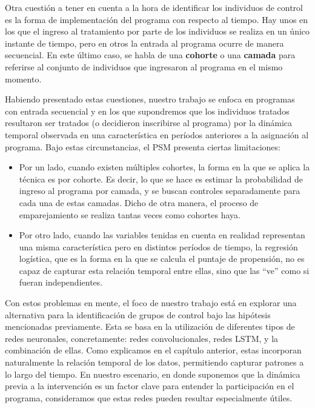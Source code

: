 \documentclass[../main.tex]{subfiles}
\begin{document}
Otra cuestión a tener en cuenta a la hora de identificar los individuos de control es la
forma de implementación del programa con respecto al tiempo. Hay unos en los que el
ingreso al tratamiento por parte de los individuos se realiza en un único instante de
tiempo, pero en otros la entrada al programa ocurre de manera secuencial. En este último
caso, se habla de una \textbf{cohorte} o una \textbf{camada} para referirse al conjunto de
individuos que ingresaron al programa en el mismo momento.

Habiendo presentado estas cuestiones, nuestro trabajo se enfoca en programas con entrada
secuencial y en los que supondremos que los individuos tratados resultaron ser tratados (o
decidieron inscribirse al programa) por la dinámica temporal observada en una
característica en períodos anteriores a la asignación al programa. Bajo estas
circunstancias, el PSM presenta ciertas limitaciones:
\begin{itemize}
    \item Por un lado, cuando existen múltiples cohortes, la forma en la que se aplica la
    técnica es por cohorte. Es decir, lo que se hace es estimar la probabilidad de ingreso
    al programa por camada, y se buscan controles separadamente para cada una de estas
    camadas. Dicho de otra manera, el proceso de emparejamiento se realiza tantas veces
    como cohortes haya.
    \item Por otro lado, cuando las variables tenidas en cuenta en realidad representan
    una misma característica pero en distintos períodos de tiempo, la regresión logística,
    que es la forma en la que se calcula el puntaje de propensión, no es capaz de capturar
    esta relación temporal entre ellas, sino que las ``ve'' como si fueran independientes.
\end{itemize}

Con estos problemas en mente, el foco de nuestro trabajo está en explorar una alternativa
para la identificación de grupos de control bajo las hipótesis mencionadas previamente.
Esta se basa en la utilización de diferentes tipos de redes neuronales, concretamente:
redes convolucionales, redes LSTM, y la combinación de ellas. Como explicamos en el
capítulo anterior, estas incorporan naturalmente la relación temporal de los datos,
permitiendo capturar patrones a lo largo del tiempo. En nuestro escenario, en donde
suponemos que la dinámica previa a la intervención es un factor clave para entender la
participación en el programa, consideramos que estas redes pueden resultar especialmente
útiles.
\end{document}
